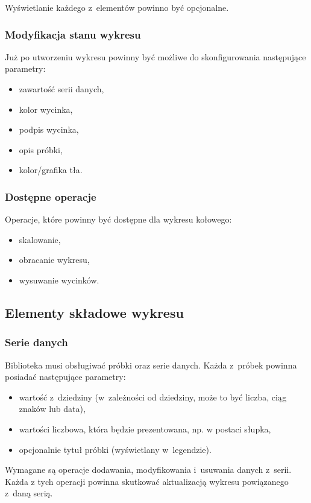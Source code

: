 \documentclass[11pt,twoside,a4paper,final]{article}
\begin{document}
Wyświetlanie każdego z~elementów powinno być opcjonalne. 

\subsubsection{Modyfikacja stanu wykresu}
Już po utworzeniu wykresu powinny być możliwe do skonfigurowania następujące parametry:
\begin{itemize}
\item{zawartość serii danych,}
\item{kolor wycinka,}
\item{podpis wycinka,}
\item{opis próbki,}
\item{kolor/grafika tła.}
\end{itemize}

\subsubsection{Dostępne operacje}
Operacje, które powinny być dostępne dla wykresu kołowego:
\begin{itemize}
\item{skalowanie,}
\item{obracanie wykresu,}
\item{wysuwanie wycinków.}
\end{itemize}

\subsection{Elementy składowe wykresu}
\subsubsection{Serie danych}
Biblioteka musi obsługiwać próbki oraz serie danych. Każda z~próbek powinna posiadać następujące parametry:
\begin{itemize}
\item{wartość z~dziedziny (w~zależności od dziedziny, może to być liczba, ciąg znaków lub data),}
\item{wartości liczbowa, która będzie prezentowana, np. w postaci słupka,}
\item{opcjonalnie tytuł próbki (wyświetlany w~legendzie).}
\end{itemize}

Wymagane są operacje dodawania, modyfikowania i~usuwania danych z~serii. Każda z tych operacji powinna skutkować aktualizacją wykresu powiązanego z~daną serią.
  
\end{document}
